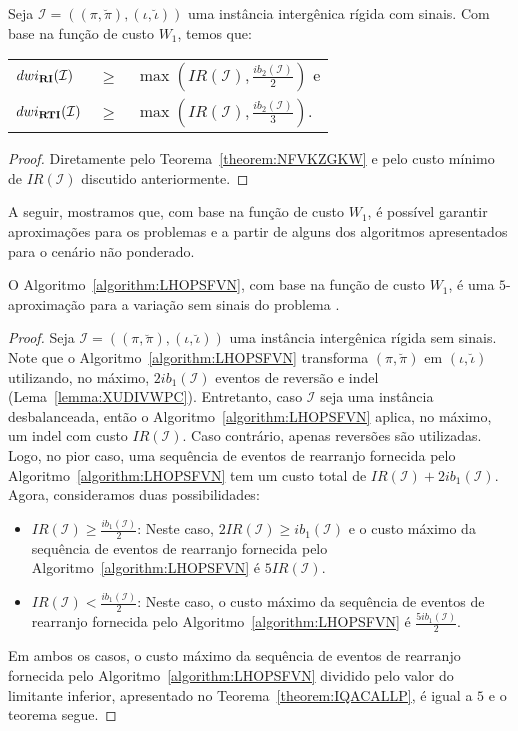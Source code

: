 \begin{theorem}\label{theorem:BOZETXBS}
Seja $\mathcal{I} = ((\pi,\breve\pi),(\iota,\breve\iota))$  uma instância intergênica rígida com sinais. Com base na função de custo $W_1$, temos que:

\begin{tabular}{lll}
  $dwi_{\textbf{RI}}(\mathcal{I})$      & $ \ge $ & $\max(IR(\mathcal{I}),\frac{ib_2(\mathcal{I})}{2})$ e \\ 
  $dwi_{\textbf{RTI}}(\mathcal{I})$     & $ \ge $ & $\max(IR(\mathcal{I}),\frac{ib_2(\mathcal{I})}{3})$.
\end{tabular}
\begin{proof}
Diretamente pelo Teorema~\ref{theorem:NFVKZGKW} e pelo custo mínimo de $IR(\mathcal{I})$ discutido anteriormente.
\end{proof}
\end{theorem}

A seguir, mostramos que, com base na função de custo $W_1$, é possível garantir aproximações para os problemas \SbWIRI{} e \SbWIRTI{} a partir de alguns dos algoritmos apresentados para o cenário não ponderado.

\begin{theorem}\label{theorem:BNWIOUVG}
O Algoritmo~\ref{algorithm:LHOPSFVN}, com base na função de custo $W_1$, é uma $5$-aproximação para a variação sem sinais do problema \SbWIRI{}.
\end{theorem}
\begin{proof}
Seja $\mathcal{I} = ((\pi,\breve\pi),(\iota,\breve\iota))$ uma instância intergênica rígida sem sinais. Note que o Algoritmo~\ref{algorithm:LHOPSFVN} transforma $(\pi,\breve\pi)$ em $(\iota,\breve\iota)$ utilizando, no máximo, $2ib_1(\mathcal{I})$ eventos de reversão e indel (Lema~\ref{lemma:XUDIVWPC}). Entretanto, caso $\mathcal{I}$ seja uma instância desbalanceada, então o Algoritmo~\ref{algorithm:LHOPSFVN} aplica, no máximo, um indel com custo $IR(\mathcal{I})$. Caso contrário, apenas reversões são utilizadas. Logo, no pior caso, uma sequência de eventos de rearranjo fornecida pelo Algoritmo~\ref{algorithm:LHOPSFVN} tem um custo total de $IR(\mathcal{I}) + 2ib_1(\mathcal{I})$. Agora, consideramos duas possibilidades:
\begin{itemize}
  \item $IR(\mathcal{I}) \ge \frac{ib_1(\mathcal{I})}{2}$: Neste caso, $2IR(\mathcal{I}) \ge ib_1(\mathcal{I})$ e o custo máximo da sequência de eventos de rearranjo fornecida pelo Algoritmo~\ref{algorithm:LHOPSFVN} é $5IR(\mathcal{I})$.
  \item $IR(\mathcal{I}) < \frac{ib_1(\mathcal{I})}{2}$: Neste caso, o custo máximo da sequência de eventos de rearranjo fornecida pelo Algoritmo~\ref{algorithm:LHOPSFVN} é $\frac{5ib_1(\mathcal{I})}{2}$.
\end{itemize}
Em ambos os casos, o custo máximo da sequência de eventos de rearranjo fornecida pelo Algoritmo~\ref{algorithm:LHOPSFVN} dividido pelo valor do limitante inferior, apresentado no Teorema~\ref{theorem:IQACALLP}, é igual a $5$ e o teorema segue.
\end{proof}

